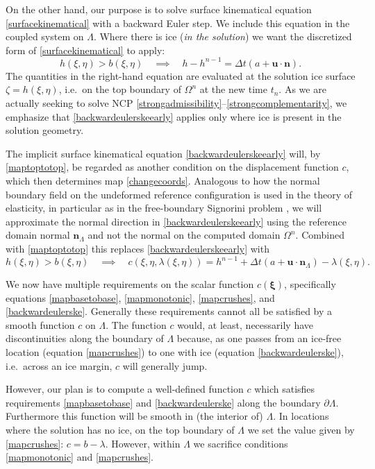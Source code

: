 \documentclass[letterpaper,final,12pt,reqno]{amsart}
\newcommand{\bn}{\mathbf{n}}
\newcommand{\bu}{\mathbf{u}}
\newcommand{\bxi}{\bm{\xi}}
\begin{document}
On the other hand, our purpose is to solve surface kinematical equation \eqref{surfacekinematical} with a backward Euler step.  We include this equation in the coupled system on $\Lambda$.  Where there is ice (\emph{in the solution}) we want the discretized form of \eqref{surfacekinematical} to apply:
\begin{equation}
h(\xi,\eta)>b(\xi,\eta) \quad \implies \quad h - h^{n-1} = \Delta t\left(a + \bu \cdot \bn\right). \label{backwardeulerskeearly}
\end{equation}
The quantities in the right-hand equation are evaluated at the solution ice surface $\zeta=h(\xi,\eta)$, i.e.~on the top boundary of $\Omega^n$ at the new time $t_n$.  As we are actually seeking to solve NCP \eqref{strongadmissibility}--\eqref{strongcomplementarity}, we emphasize that \eqref{backwardeulerskeearly} applies only where ice is present in the solution geometry.

The implicit surface kinematical equation \eqref{backwardeulerskeearly} will, by \eqref{maptoptotop}, be regarded as another condition on the displacement function $c$, which then determines map \eqref{changecoords}.  Analogous to how the normal boundary field on the undeformed reference configuration is used in the theory of elasticity, in particular as in the free-boundary Signorini problem \cite[sections 2.6 and 6.2]{Stewart2011}, we will approximate the normal direction in \eqref{backwardeulerskeearly} using the reference domain normal $\bn_\Lambda$ and not the normal on the computed domain $\Omega^n$.  Combined with \eqref{maptoptotop} this replaces \eqref{backwardeulerskeearly} with
\begin{equation}
h(\xi,\eta)>b(\xi,\eta) \quad \implies \quad c(\xi,\eta,\lambda(\xi,\eta)) = h^{n-1} + \Delta t\left(a + \bu \cdot \bn_\Lambda\right) - \lambda(\xi,\eta). \label{backwardeulerske}
\end{equation}

We now have multiple requirements on the scalar function $c(\bxi)$, specifically equations \eqref{mapbasetobase}, \eqref{mapmonotonic}, \eqref{mapcrushes}, and \eqref{backwardeulerske}.  Generally these requirements cannot all be satisfied by a smooth function $c$ on $\Lambda$.  The function $c$ would, at least, necessarily have discontinuities along the boundary of $\Lambda$ because, as one passes from an ice-free location (equation \eqref{mapcrushes}) to one with ice (equation \eqref{backwardeulerske}), i.e.~across an ice margin, $c$ will generally jump.

However, our plan is to compute a well-defined function $c$ which satisfies requirements \eqref{mapbasetobase} and \eqref{backwardeulerske} along the boundary $\partial \Lambda$.  Furthermore this function will be smooth in (the interior of) $\Lambda$.  In locations where the solution has no ice, on the top boundary of $\Lambda$ we set the value given by \eqref{mapcrushes}: $c=b-\lambda$.  However, within $\Lambda$ we sacrifice conditions \eqref{mapmonotonic} and \eqref{mapcrushes}.
\end{document}
